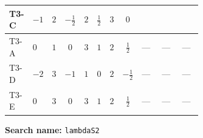 \documentclass[8pt]{article}
\begin{document}
\begin{landscape}
\begin{longtable}{@{}llcccccc >{\raggedright\arraybackslash}p{0.21\linewidth} >{\raggedright\arraybackslash}p{0.21\linewidth} >{\raggedright\arraybackslash}p{0.21\linewidth}@{}}
T3-C & $-1$ & $2$ & $-\frac{1}{2}$ & $2$ & $\frac{1}{2}$ & $3$ & $0$ & \scriptsize\adjustbox{max width=\linewidth}{$\begin{gathered} 8 {\lambda_{H^\dagger H^\dagger S_2 S_2}} \left({\lambda_{H^\dagger H^\dagger S_2 S_2}}\right)^{*}\end{gathered}$} & \scriptsize\adjustbox{max width=\linewidth}{$\begin{gathered} +8 {\lambda_{S_1^{\dagger 2}S_2^{\dagger 2}}} \left({\lambda_{S_1^{\dagger 2}S_2^{\dagger 2}}}\right)^{*}\end{gathered}$} & \scriptsize\adjustbox{max width=\linewidth}{$\begin{gathered} +24 {\lambda_{S_1^\dagger S_2 S_2^{\dagger 2}}} \left({\lambda_{S_1^\dagger S_2 S_2^{\dagger 2}}}\right)^{*}\end{gathered}$} \\
\midrule
T3-A & $0$ & $1$ & $0$ & $3$ & $1$ & $2$ & $\frac{1}{2}$ & --- & --- & --- \\
\midrule
T3-D & $-2$ & $3$ & $-1$ & $1$ & $0$ & $2$ & $-\frac{1}{2}$ & --- & --- & --- \\
\midrule
T3-E & $0$ & $3$ & $0$ & $3$ & $1$ & $2$ & $\frac{1}{2}$ & --- & --- & --- \\
\midrule
\bottomrule
\end{longtable}
\clearpage
\noindent\textbf{Search name: }\texttt{lambdaS2}\par\smallskip

\end{landscape}
\end{document}
